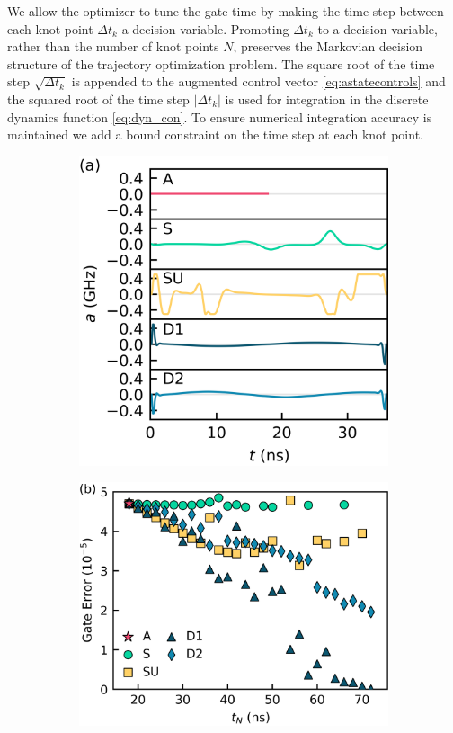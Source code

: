 We allow the optimizer to tune the gate time by
making the time step between each knot point $\Delta t_{k}$
a decision variable. Promoting $\Delta t_{k}$ to a decision variable, rather
than the number of knot points $N$, preserves the
Markovian decision structure of the trajectory
optimization problem. The square root of the time step $\sqrt{\Delta t_{k}}$
is appended to the augmented control vector \eqref{eq:astatecontrols}
and the squared root
of the time step $\lvert \Delta t_{k} \rvert$ is used
for integration in the discrete dynamics function \eqref{eq:dyn_con}.
To ensure numerical
integration accuracy is maintained we add a bound
constraint on the time step at each knot point.

\begin{figure}[ht]
  \begin{subfigure}{.315\textwidth}
    \includegraphics[width=\linewidth]{assets/f2a.png}
    \caption{\label{fig:statica}}
  \end{subfigure}\hfill
  \begin{subfigure}{.4\textwidth}
    \includegraphics[width=\linewidth]{assets/f2b.png}

\end{subfigure}
\end{figure}
